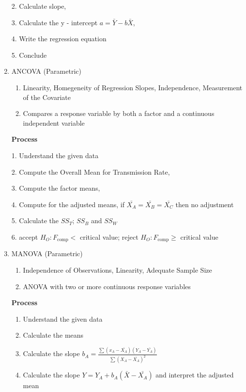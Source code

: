 \documentclass[4pt]{article}
\begin{document}
\begin{multicols*}{2}
\begin{enumerate}
        2. Calculate slope, 

        3. Calculate the y - intercept $a = \bar{Y} - b\bar{X}$,
    
        4. Write the regression equation

        5. Conclude

        \item ANCOVA (Parametric)
        \begin{enumerate}
            \item Linearity, Homegeneity of Regression Slopes, Independence, Measurement of the Covariate
            \item Compares a response variable by both a factor and a continuous independent variable
        \end{enumerate}
        \textbf{Process}
            
        1. Understand the given data
    
        2. Compute the Overall Mean for Transmission Rate, 

        3. Compute the factor means,
    
        4. Compute for the adjusted means, if $\bar{X_A}=\bar{X_B}=\bar{X_C}$ then no adjustment

        5. Calculate the $SS_T$; $SS_B$ and $SS_W$

        6. accept $H_O: F_{\text{comp}} <$ critical value; reject $H_O: F_{\text{comp}} \geq$ critical value

        \item MANOVA (Parametric)
        \begin{enumerate}
            \item Independence of Observations, Linearity, Adequate Sample Size
            \item ANOVA with two or more continuous response variables
        \end{enumerate}
        \textbf{Process}
        \begin{enumerate}
            \item Understand the given data
            \item Calculate the means
            \item Calculate the slope $b_A=\frac{\sum{(x_A-\bar{X_A})(Y_A-\bar{Y_A})}}{\sum{(X_A-\bar{X_A})^2}}$
            \item Calculate the slope $Y=Y_A+b_A(\bar{X}-\bar{X_A})$ and interpret the adjusted mean
        \end{enumerate}


\end{enumerate}
\end{multicols*}
\end{document}
